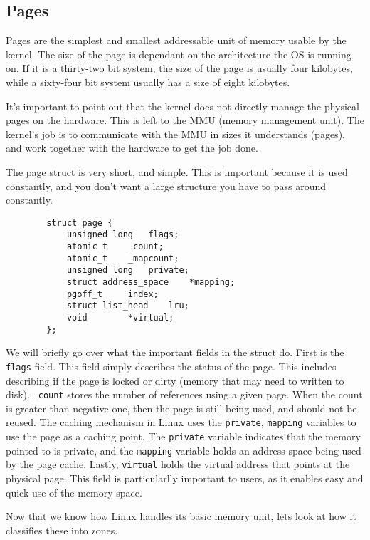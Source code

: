   \subsection{Pages}
  	Pages are the simplest and smallest addressable unit of memory usable
	by the kernel. The size of the page is dependant on the architecture
	the OS is running on. If it is a thirty-two bit system, the size of the
	page is usually four kilobytes, while a sixty-four bit system usually
	has a size of eight kilobytes. \cite{robertlove2010}

	It's important to point out that the kernel does not directly manage the
	physical pages on the hardware. This is left to the MMU (memory
	management unit). The kernel's job is to communicate with the MMU in
	sizes it understands (pages), and work together with the hardware to
	get the job done.

	The page struct is very short, and simple. This is important because it
	is used constantly, and you don't want a large structure you have to
	pass around constantly. \cite{robertlove2010}

	\begin{lstlisting}
		struct page {
			unsigned long	flags;
			atomic_t	_count;
			atomic_t	_mapcount;
			unsigned long	private;
			struct address_space	*mapping;
			pgoff_t		index;
			struct list_head	lru;
			void 		*virtual;
		};
	\end{lstlisting}

	We will briefly go over what the important fields in the struct do.
	First is the \texttt{flags} field. This field simply describes the
	status of the page. This includes describing if the page is locked or
	dirty (memory that may need to written to disk). \texttt{\_count}
	stores the number of references using a given page. When the count is
	greater than negative one, then the page is still being used, and should
	not be reused. The caching mechanism in Linux uses the \texttt{private},
	\texttt{mapping} variables to use the page as a caching point. The
	\texttt{private} variable indicates that the memory pointed to is private,
	and the \texttt{mapping} variable holds an address space being used by
	the page cache. Lastly, \texttt{virtual} holds the virtual address that
	points at the physical page. This field is particularlly important to
	users, as it enables easy and quick use of the memory space.

	Now that we know how Linux handles its basic memory unit, lets look at
	how it classifies these into zones.
